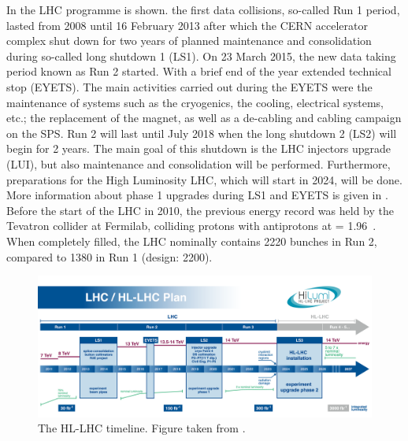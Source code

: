 In  the LHC programme is shown. the first data collisions, so-called Run 1 period, lasted from 2008 until 16 February 2013 after which  the CERN accelerator complex shut down for two years of planned maintenance and consolidation during so-called long shutdown 1 (LS1). On 23 March 2015, the new data taking period known as Run 2 started. With a brief end of the year extended technical stop (EYETS). The main activities carried out during the EYETS were the maintenance of systems such as the cryogenics, the cooling, electrical systems, etc.; the replacement of the magnet, as well as a de-cabling and cabling campaign on the SPS\cite{MurilloQuijada:2017agx}. Run 2 will last until July 2018 when the  long shutdown 2 (LS2) will begin for 2 years. The main goal of this shutdown is the LHC injectors upgrade (LUI), but also maintenance and consolidation will be performed. Furthermore, preparations for the High Luminosity LHC, which will start in 2024, will be done. More information about phase 1 upgrades during LS1 and EYETS is given in .\\ %
 Before the start of the LHC in 2010, the previous energy record was held by the Tevatron collider at Fermilab, colliding protons with antiprotons at \com = 1.96~\TeV.  When completely filled, the LHC nominally contains 2220 bunches in Run 2, compared to 1380 in Run 1 (design: 2200). 
\begin{figure}[htbp]
	\centering
	\includegraphics[width=1.\linewidth]{2_ExperimentalSetup/Figures/lhc_schedule}
	\caption{The HL-LHC timeline. Figure taken from \cite{Antonella:1975962}.}
	\label{fig:lhcschedule}
\end{figure}


